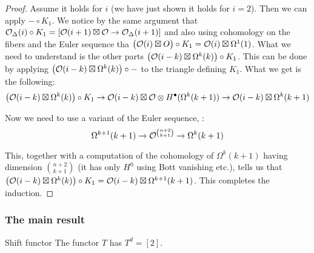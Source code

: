 \begin{proof}
    Assume it holds for $i$ (we have just shown it holds for $i=2$). Then we can apply $-\circ K_1$. We notice by the same argument that $\mathcal{O}_\Delta(i)\circ K_1= [\mathcal{O}(i+1)\boxtimes \mathcal{O} \rightarrow \mathcal{O}_\Delta(i+1)]$ and also using cohomology on the fibers and the Euler sequence tha $\big( \mathcal{O}(i)\boxtimes O\big)\circ K_1=\mathcal{O}(i)\boxtimes \Omega^1(1)$. What we need to understand is the other parts $\big(\mathcal{O}(i-k)\boxtimes \Omega^{k}(k)\big) \circ K_1$. This can be done by applying $\big(\mathcal{O}(i-k)\boxtimes \Omega^k(k)\big)\circ -$ to the triangle defining $K_1$. What we get is the following: $$\big(\mathcal{O}(i-k)\boxtimes \Omega^k(k)\big)\circ K_1 \rightarrow \mathcal{O}(i-k)\boxtimes \mathcal{O} \otimes H^\bullet(\Omega^k(k+1))\rightarrow \mathcal{O}(i-k)\boxtimes \Omega^k(k+1)$$
    
    Now we need to use a variant of the Euler sequence, \cite[Corollary 17.1.3]{arapura_algebraic_2012}: $$\Omega^{k+1}(k+1)\rightarrow \mathcal{O}^{\binom{n+2}{k+1}}\rightarrow \Omega^k(k+1)$$
    
    This, together with a computation of the cohomology of $\Omega^k(k+1)$ having dimension $\binom{n+2}{k+1}$ (it has only $H^0$ using Bott vanishing etc.), tells us that $\big(\mathcal{O}(i-k)\boxtimes \Omega^{k}(k)\big) \circ K_1=\mathcal{O}(i-k)\boxtimes \Omega^{k+1}(k+1)$. This completes the induction.
\end{proof}

\subsubsection{The main result}

\begin{theorem}{Shift functor}{}
    The functor $T$ has $T^d=[2]$.
\end{theorem}

